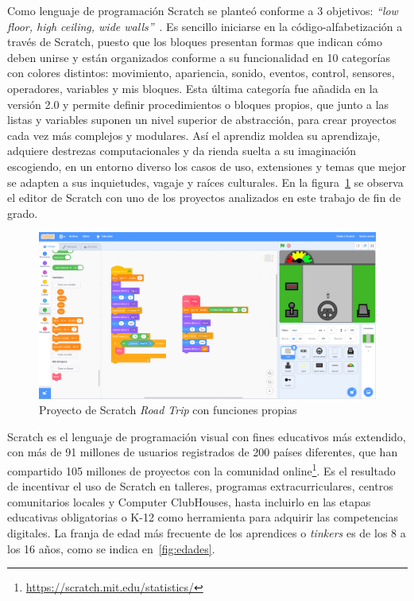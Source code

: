 \documentclass[a4paper, 12pt]{book}
\begin{document}
Como lenguaje de programación Scratch se planteó conforme a 3 objetivos: \emph{``low floor, high ceiling, wide walls''}~\cite{resnick2009scratch}. Es sencillo iniciarse en la código-alfabetización a través de Scratch, puesto que los bloques presentan formas que indican cómo deben unirse y están organizados conforme a su funcionalidad en 10 categorías con colores distintos: movimiento, apariencia, sonido, eventos, control, sensores, operadores, variables y mis bloques. Esta última categoría fue añadida en la versión 2.0 y permite definir procedimientos o bloques propios, que junto a las listas y variables suponen un nivel superior de abstracción, para crear proyectos cada vez más complejos y modulares. Así el aprendiz moldea su aprendizaje, adquiere destrezas computacionales y da rienda suelta a su imaginación escogiendo, en un entorno diverso los casos de uso, extensiones y temas que mejor se adapten a sus inquietudes, vagaje y raíces culturales. En la figura~\ref{fig:road_trip} se observa el editor de Scratch con uno de los proyectos analizados en este trabajo de fin de grado. 

\begin{figure}
    \centering
    \includegraphics[width=.8\textwidth]{img/proy_Scratch}
    \caption{Proyecto de Scratch \emph{Road Trip} con funciones propias}\label{fig:road_trip}
\end{figure}
 
Scratch es el lenguaje de programación visual con fines educativos más extendido, con más de 91 millones de usuarios registrados de 200 países diferentes, que han compartido 105 millones de proyectos con la comunidad online\footnote{\url{https://scratch.mit.edu/statistics/}}. Es el resultado de incentivar el uso de Scratch en talleres, programas extracurriculares, centros comunitarios locales y Computer ClubHouses, hasta incluirlo en las etapas educativas obligatorias o K-12 como herramienta para adquirir las competencias digitales. La franja de edad más frecuente de los aprendices o \emph{tinkers} es de los 8 a los 16 años, como se indica en~\ref{fig:edades}. %
\end{document}
